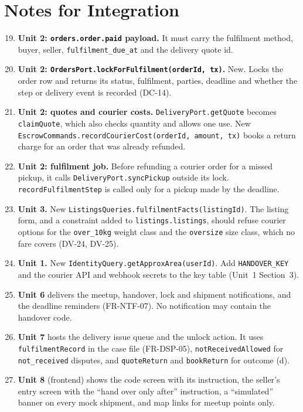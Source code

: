 \documentclass[11pt,a4paper]{article}
\begin{document}
\section{Notes for Integration}
\label{sec:notes}
\begin{enumerate}[label=\textbf{I-\arabic*}, leftmargin=*, nosep]
  \setcounter{enumi}{18}
  \item \textbf{Unit 2: \texttt{orders.order.paid} payload.} It must carry the fulfilment method, buyer, seller, \texttt{fulfilment\_due\_at} and the delivery quote id.
  \item \textbf{Unit 2: \texttt{OrdersPort.lockForFulfilment(orderId, tx)}.} New. Locks the order row and returns its status, fulfilment, parties, deadline and whether the step or delivery event is recorded (DC-14).
  \item \textbf{Unit 2: quotes and courier costs.} \texttt{DeliveryPort.getQuote} becomes \texttt{claimQuote}, which also checks quantity and allows one use. New \texttt{EscrowCommands.recordCourierCost(orderId, amount, tx)} books a return charge for an order that was already refunded.
  \item \textbf{Unit 2: fulfilment job.} Before refunding a courier order for a missed pickup, it calls \texttt{DeliveryPort.syncPickup} outside its lock. \texttt{recordFulfilmentStep} is called only for a pickup made by the deadline.
  \item \textbf{Unit 3.} New \texttt{ListingsQueries.fulfilmentFacts(listingId)}. The listing form, and a constraint added to \texttt{listings.listings}, should refuse courier options for the \texttt{over\_10kg} weight class and the \texttt{oversize} size class, which no fare covers (DV-24, DV-25).
  \item \textbf{Unit 1.} New \texttt{IdentityQuery.getApproxArea(userId)}. Add \texttt{HANDOVER\_KEY} and the courier API and webhook secrets to the key table (Unit~1 Section~3).
  \item \textbf{Unit 6} delivers the meetup, handover, lock and shipment notifications, and the deadline reminders (FR-NTF-07). No notification may contain the handover code.
  \item \textbf{Unit 7} hosts the delivery issue queue and the unlock action. It uses \texttt{fulfilmentRecord} in the case file (FR-DSP-05), \texttt{notReceivedAllowed} for \texttt{not\_received} disputes, and \texttt{quoteReturn} and \texttt{bookReturn} for outcome (d).
  \item \textbf{Unit 8} (frontend) shows the code screen with its instruction, the seller's entry screen with the ``hand over only after'' instruction, a ``simulated'' banner on every mock shipment, and map links for meetup points only.

\end{enumerate}
\end{document}
